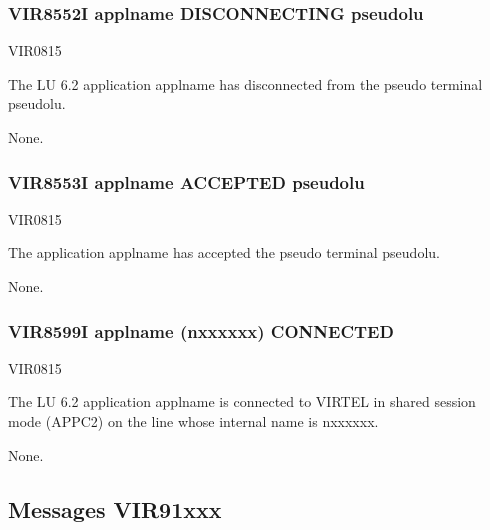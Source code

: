 \documentclass[letterpaper,10pt,english]{sphinxmanual}
\begin{document}
\subsubsection{VIR8552I applname DISCONNECTING pseudolu}
\label{\detokenize{messages:vir8552i-applname-disconnecting-pseudolu}}\begin{description}
\sphinxAtStartPar
VIR0815

\sphinxAtStartPar
The LU 6.2 application applname has disconnected from the pseudo terminal pseudolu.

\sphinxAtStartPar
None.

\end{description}


\subsubsection{VIR8553I applname ACCEPTED pseudolu}
\label{\detokenize{messages:vir8553i-applname-accepted-pseudolu}}\begin{description}
\sphinxAtStartPar
VIR0815

\sphinxAtStartPar
The application applname has accepted the pseudo terminal pseudolu.

\sphinxAtStartPar
None.

\end{description}


\subsubsection{VIR8599I applname (n\sphinxhyphen{}xxxxxx) CONNECTED}
\label{\detokenize{messages:vir8599i-applname-n-xxxxxx-connected}}\begin{description}
\sphinxAtStartPar
VIR0815

\sphinxAtStartPar
The LU 6.2 application applname is connected to VIRTEL in shared session mode (APPC2) on the line whose internal name is n\sphinxhyphen{}xxxxxx.

\sphinxAtStartPar
None.

\end{description}


\subsection{Messages VIR91xxx}
\label{\detokenize{messages:messages-vir91xxx}}
\end{document}
